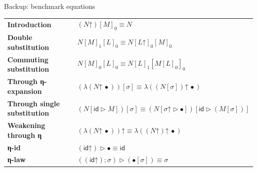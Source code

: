 \documentclass[pdftex,aspectratio=169]{beamer}
\newcommand{\Blob}{\ensuremath{\bullet}}
\newcommand{\Wk}{\ensuremath{\mathord{\uparrow}}}
\begin{document}
\begin{frame}{Backup: benchmark equations}
  \scriptsize
  \renewcommand{\arraystretch}{1.45}
  \setlength{\tabcolsep}{4pt}
  \begin{tabular}{>{\bfseries}p{} p{}}
    Introduction & \((N\Wk)[M]_0 \equiv N\) \\
    Double substitution & \(N[M]_1[L]_0 \equiv N[L\Wk]_0[M]_0\) \\
    Commuting substitution & \(N[M]_0[L]_0 \equiv N[L]_1[M[L]_0]_0\) \\
    Through η-expansion & \((\lambda(N\Wk\,\Blob))[\sigma] \equiv \lambda((N[\sigma])\Wk\,\Blob)\) \\
    Through single substitution & \((N[\mathsf{id}\mathbin{\rhd}M])[\sigma]
      \equiv (N[\sigma\Wk\mathbin{\rhd}\Blob])[\mathsf{id}\mathbin{\rhd}(M[\sigma])]\) \\
    Weakening through η & \((\lambda(N\Wk\,\Blob))\Wk \equiv \lambda((N\Wk)\Wk\,\Blob)\) \\
    η-id & \((\mathsf{id}\Wk)\mathbin{\rhd}\Blob \equiv \mathsf{id}\) \\
    η-law & \(((\mathsf{id}\Wk)\mathbin{;}\sigma)\mathbin{\rhd}(\Blob[\sigma]) \equiv \sigma\) \\
  \end{tabular}
\end{frame}
\end{document}
